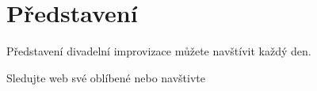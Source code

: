 \needspace{5cm} \section{Představení} \label{představení} Představení divadelní improvizace můžete navštívit každý den. 
 
Sledujte web své oblíbené  nebo navštivte  
